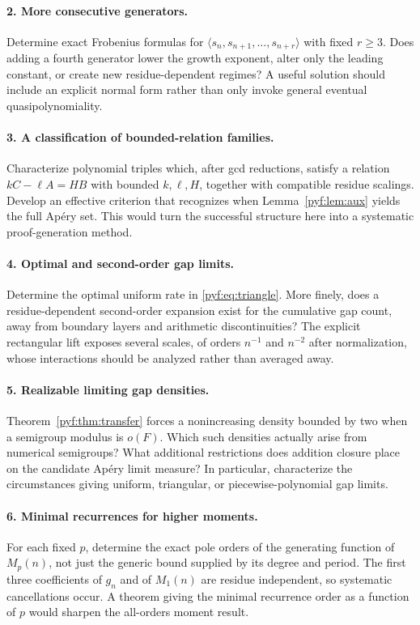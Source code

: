 \documentclass[11pt,a4paper]{article}
\numberwithin{equation}{section}
\theoremstyle{definition}
\begin{document}
\paragraph{2. More consecutive generators.}
Determine exact Frobenius formulas for
$\langle s_n,s_{n+1},\ldots,s_{n+r}\rangle$ with fixed $r\geq3$.
Does adding a fourth generator lower the growth exponent, alter only the
leading constant, or create new residue-dependent regimes? A useful
solution should include an explicit normal form rather than only invoke
general eventual quasipolynomiality.

\paragraph{3. A classification of bounded-relation families.}
Characterize polynomial triples which, after gcd reductions, satisfy a
relation $kC-\ell A=HB$ with bounded $k,\ell,H$, together with compatible
residue scalings. Develop an effective criterion that recognizes when
Lemma~\ref{pyf:lem:aux} yields the full Ap\'ery set. This would turn the
successful structure here into a systematic proof-generation method.

\paragraph{4. Optimal and second-order gap limits.}
Determine the optimal uniform rate in \eqref{pyf:eq:triangle}. More finely,
does a residue-dependent second-order expansion exist for the cumulative
gap count, away from boundary layers and arithmetic discontinuities?
The explicit rectangular lift exposes several scales, of orders
$n^{-1}$ and $n^{-2}$ after normalization, whose interactions should be
analyzed rather than averaged away.

\paragraph{5. Realizable limiting gap densities.}
Theorem~\ref{pyf:thm:transfer} forces a nonincreasing density bounded by two
when a semigroup modulus is $o(F)$. Which such densities actually arise
from numerical semigroups? What additional restrictions does addition
closure place on the candidate Ap\'ery limit measure? In particular,
characterize the circumstances giving uniform, triangular, or
piecewise-polynomial gap limits.

\paragraph{6. Minimal recurrences for higher moments.}
For each fixed $p$, determine the exact pole orders of the generating
function of $M_p(n)$, not just the generic bound supplied by its degree and
period. The first three coefficients of $g_n$ and of $M_1(n)$ are
residue independent, so systematic cancellations occur. A theorem giving
the minimal recurrence order as a function of $p$ would sharpen the
all-orders moment result.
\end{document}
